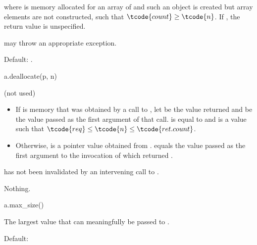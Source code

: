 \begin{itemdescr}
\pnum
\result
{}

\pnum
\returns
{}
where  is memory allocated for an array of  
and such an object is created but array elements are not constructed,
such that $\tcode{count} \geq \tcode{n}$.
If , the return value is unspecified.

\pnum
\throws
{} may throw an appropriate exception.

\pnum
\remarks
Default: .
\end{itemdescr}

\begin{itemdecl}
a.deallocate(p, n)
\end{itemdecl}

\begin{itemdescr}
\pnum
\result
(not used)

\pnum
\expects
\begin{itemize}
\item
If  is memory
that was obtained by a call to ,
let  be the value returned and
 be the value passed as the first argument of that call.
 is equal to  and
 is a value such that
$\tcode{req} \leq \tcode{n} \leq \tcode{ret.count}$.
\item
Otherwise,  is a pointer value obtained from .
 equals the value passed as the first argument
to the invocation of  which returned .
\end{itemize}
 has not been invalidated by
an intervening call to .

\pnum
\throws
Nothing.
\end{itemdescr}

\begin{itemdecl}
a.max_size()
\end{itemdecl}

\begin{itemdescr}
\pnum
\result
{}

\pnum
\returns
The largest value  that can meaningfully be passed to .

\pnum
\remarks
Default:
\end{itemdescr}

